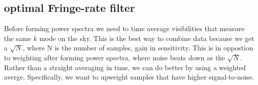\documentclass[twocolumn,numberedappendix]{emulateapj}
\begin{document}
%
%
%
%






\subsection{optimal Fringe-rate filter}

Before forming power spectra we need to time average visibilities that measure
the same $k$ mode on the sky. This is the best way to combine data because we
get a $\sqrt{N}$, where N is the number of samples, gain in sensitivity. This is
in oppostion to weighting after forming power spectra, where noise beats down as
the $\sqrt{N}$. Rather than a straight averaging in time, we can do better by
using a weighted averge. Specifically, we want to upweight samples that have
higher signal-to-noise. 
\end{document}
